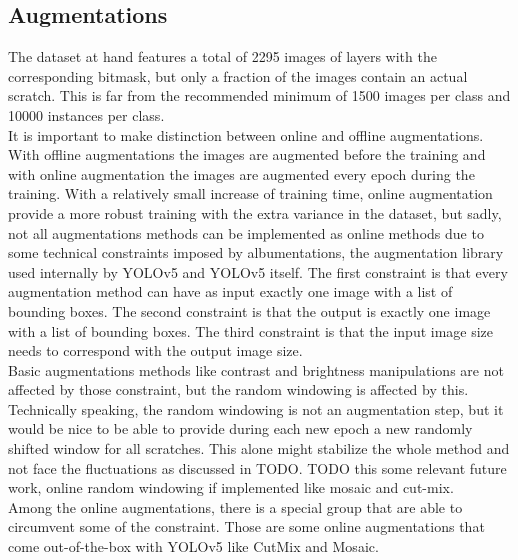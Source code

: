 \subsection{Augmentations}
The dataset at hand features a total of 2295 images of layers with the corresponding bitmask, but only a fraction of the images contain an actual scratch. This is far from the recommended minimum of 1500 images per class and 10000 instances per class. \\
It is important to make distinction between online and offline augmentations. With offline augmentations the images are augmented before the training and with online augmentation the images are augmented every epoch during the training. With a relatively small increase of training time, online augmentation provide a more robust training with the extra variance in the dataset, but sadly, not all augmentations methods can be implemented as online methods due to some technical constraints imposed by albumentations, the augmentation library used internally by YOLOv5 and YOLOv5 itself. The first constraint is that every augmentation method can have as input exactly one image with a list of bounding boxes. The second constraint is that the output is exactly one image with a list of bounding boxes. The third constraint is that the input image size needs to correspond with the output image size. \\
Basic augmentations methods like contrast and brightness manipulations are not affected by those constraint, but the random windowing is affected by this. Technically speaking, the random windowing is not an augmentation step, but it would be nice to be able to provide during each new epoch a new randomly shifted window for all scratches. This alone might stabilize the whole method and not face the fluctuations as discussed in TODO. TODO this some relevant future work, online random windowing if implemented like mosaic and cut-mix.\\
Among the online augmentations, there is a special group that are able to circumvent some of the constraint. Those are some online augmentations that come out-of-the-box with YOLOv5 like CutMix and Mosaic. \\

